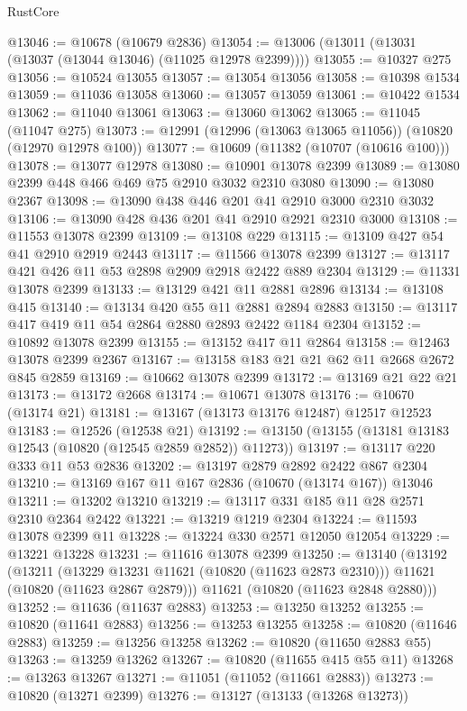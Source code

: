\begin{lexlean}{RustCore}
\begin{coremodule}
@13046 := @10678 (@10679 @2836)
@13054 := @13006 (@13011 (@13031 (@13037 (@13044 @13046) (@11025 @12978 @2399))))
@13055 := @10327 @275
@13056 := @10524 @13055
@13057 := @13054 @13056
@13058 := @10398 @1534
@13059 := @11036 @13058
@13060 := @13057 @13059
@13061 := @10422 @1534
@13062 := @11040 @13061
@13063 := @13060 @13062
@13065 := @11045 (@11047 @275)
@13073 := @12991 (@12996 (@13063 @13065 @11056)) (@10820 (@12970 @12978 @100))
@13077 := @10609 (@11382 (@10707 (@10616 @100)))
@13078 := @13077 @12978
@13080 := @10901 @13078 @2399
@13089 := @13080 @2399 @448 @466 @469 @75 @2910 @3032 @2310 @3080
@13090 := @13080 @2367
@13098 := @13090 @438 @446 @201 @41 @2910 @3000 @2310 @3032
@13106 := @13090 @428 @436 @201 @41 @2910 @2921 @2310 @3000
@13108 := @11553 @13078 @2399
@13109 := @13108 @229
@13115 := @13109 @427 @54 @41 @2910 @2919 @2443
@13117 := @11566 @13078 @2399
@13127 := @13117 @421 @426 @11 @53 @2898 @2909 @2918 @2422 @889 @2304
@13129 := @11331 @13078 @2399
@13133 := @13129 @421 @11 @2881 @2896
@13134 := @13108 @415
@13140 := @13134 @420 @55 @11 @2881 @2894 @2883
@13150 := @13117 @417 @419 @11 @54 @2864 @2880 @2893 @2422 @1184 @2304
@13152 := @10892 @13078 @2399
@13155 := @13152 @417 @11 @2864
@13158 := @12463 @13078 @2399 @2367
@13167 := @13158 @183 @21 @21 @62 @11 @2668 @2672 @845 @2859
@13169 := @10662 @13078 @2399
@13172 := @13169 @21 @22 @21
@13173 := @13172 @2668
@13174 := @10671 @13078
@13176 := @10670 (@13174 @21)
@13181 := @13167 (@13173 @13176 @12487) @12517 @12523
@13183 := @12526 (@12538 @21)
@13192 := @13150 (@13155 (@13181 @13183 @12543 (@10820 (@12545 @2859 @2852)) @11273))
@13197 := @13117 @220 @333 @11 @53 @2836
@13202 := @13197 @2879 @2892 @2422 @867 @2304
@13210 := @13169 @167 @11 @167 @2836 (@10670 (@13174 @167)) @13046
@13211 := @13202 @13210
@13219 := @13117 @331 @185 @11 @28 @2571 @2310 @2364 @2422
@13221 := @13219 @1219 @2304
@13224 := @11593 @13078 @2399 @11
@13228 := @13224 @330 @2571 @12050 @12054
@13229 := @13221 @13228
@13231 := @11616 @13078 @2399
@13250 := @13140
    (@13192
      (@13211
        (@13229 @13231 @11621 (@10820 (@11623 @2873 @2310)))
        @11621
        (@10820 (@11623 @2867 @2879)))
      @11621
      (@10820 (@11623 @2848 @2880)))
@13252 := @11636 (@11637 @2883)
@13253 := @13250 @13252
@13255 := @10820 (@11641 @2883)
@13256 := @13253 @13255
@13258 := @10820 (@11646 @2883)
@13259 := @13256 @13258
@13262 := @10820 (@11650 @2883 @55)
@13263 := @13259 @13262
@13267 := @10820 (@11655 @415 @55 @11)
@13268 := @13263 @13267
@13271 := @11051 (@11052 (@11661 @2883))
@13273 := @10820 (@13271 @2399)
@13276 := @13127 (@13133 (@13268 @13273))

\end{coremodule}
\end{lexlean}
